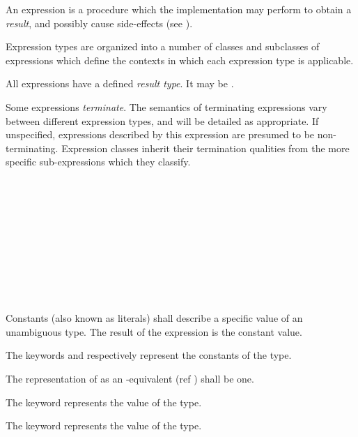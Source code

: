 
\specsubitem
An expression is a procedure which the implementation may perform to obtain a
\textit{result}, and possibly cause side-effects (see
).

\specsubitem
Expression types are organized into a number of classes and subclasses of
expressions which define the contexts in which each expression type is
applicable.

\specsubitem
All expressions have a defined \textit{result type}. It may be .

\specsubitem
Some expressions \textit{terminate}. The semantics of terminating expressions
vary between different expression types, and will be detailed as appropriate.
If unspecified, expressions described by this expression are presumed to be
non-terminating. Expression classes inherit their termination qualities from the
more specific sub-expressions which they classify.


\begin{grammar}
 \\
	 \\
	 \\
	 \\
	 \\
	 \\
	 \\
	 \\
	 \\
\end{grammar}

\specsubsubitem
Constants (also known as literals) shall describe a specific value of an
unambiguous type. The result of the expression is the constant value.

\specsubsubitem
The keywords  and  respectively represent
the constants of the  type.

\specsubsubitem
The representation of  as an -equivalent (ref
) shall be one.

\specsubsubitem
The  keyword represents the  value of the
 type.

\specsubsubitem
The  keyword represents the  value of the
 type.

